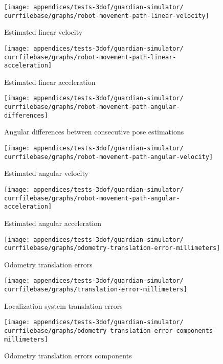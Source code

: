 \begin{figure}[H]
	\centering
	\texttt{[image: appendices/tests-3dof/guardian-simulator/\\currfilebase/graphs/robot-movement-path-linear-velocity]}
	\caption{Estimated linear velocity}
\end{figure}

\begin{figure}[H]
	\centering
	\texttt{[image: appendices/tests-3dof/guardian-simulator/\\currfilebase/graphs/robot-movement-path-linear-acceleration]}
	\caption{Estimated linear acceleration}
\end{figure}


\begin{figure}[H]
	\centering
	\texttt{[image: appendices/tests-3dof/guardian-simulator/\\currfilebase/graphs/robot-movement-path-angular-differences]}
	\caption{Angular differences between consecutive pose estimations}
\end{figure}

\begin{figure}[H]
	\centering
	\texttt{[image: appendices/tests-3dof/guardian-simulator/\\currfilebase/graphs/robot-movement-path-angular-velocity]}
	\caption{Estimated angular velocity}
\end{figure}

\begin{figure}[H]
	\centering
	\texttt{[image: appendices/tests-3dof/guardian-simulator/\\currfilebase/graphs/robot-movement-path-angular-acceleration]}
	\caption{Estimated angular acceleration}
\end{figure}


\begin{figure}[H]
	\centering
	\texttt{[image: appendices/tests-3dof/guardian-simulator/\\currfilebase/graphs/odometry-translation-error-millimeters]}
	\caption{Odometry translation errors}
\end{figure}

\begin{figure}[H]
	\centering
	\texttt{[image: appendices/tests-3dof/guardian-simulator/\\currfilebase/graphs/translation-error-millimeters]}
	\caption{Localization system translation errors}
\end{figure}


\begin{figure}[H]
	\centering
	\texttt{[image: appendices/tests-3dof/guardian-simulator/\\currfilebase/graphs/odometry-translation-error-components-millimeters]}
	\caption{Odometry translation errors components}
\end{figure}

